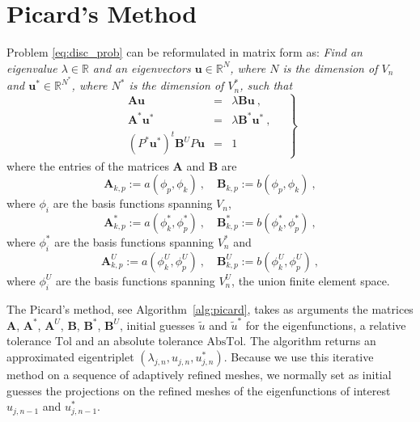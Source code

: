 \documentclass[smallextended]{svjour3}
\begin{document}

\section{Picard's Method}\label{sec:picard}

Problem \eqref{eq:disc_prob} can be reformulated in matrix form as:
\emph{Find an eigenvalue $\lambda\in \mathbb{R}$ and an eigenvectors $\mathbf{u}\in \mathbb{R}^N$, where $N$ is the dimension of $V_n$ and $\mathbf{u}^*\in \mathbb{R}^{N^*}$, where $N^*$ is the dimension of $V_n^*$,
such that}
\begin{equation}
\label{eq:disc_prob_mat}
\left.
\begin{array}{lcl}
\mathbf{A} \mathbf{u}&=& \lambda\mathbf{B}\mathbf{u}\ ,
\\
\mathbf{A}^* \mathbf{u}^*&=& \lambda\mathbf{B}^*\mathbf{u}^*\ ,
\\
(P^*\mathbf{u}^*)^t\mathbf{B}^U P\mathbf{u} &=& 1
\end{array}\quad
\right\}
\end{equation}
where the entries of the matrices $\mathbf{A}$ and $\mathbf{B}$ are 
$$
\mathbf{A}_{k,p}:=a(\phi_p,\phi_k)\ ,\quad\mathbf{B}_{k,p}:=b(\phi_p,\phi_k)\ ,
$$
where $\phi_i$ are the basis functions spanning $V_n$,
$$
\mathbf{A}^*_{k,p}:=a(\phi_k^*,\phi_p^*)\ ,\quad\mathbf{B}^*_{k,p}:=b(\phi_k^*,\phi_p^*)\ ,
$$
where $\phi_i^*$ are the basis functions spanning $V_n^*$ and
$$
\mathbf{A}^U_{k,p}:=a(\phi_k^U,\phi_p^U)\ ,\quad\mathbf{B}^U_{k,p}:=b(\phi_k^U,\phi_p^U)\ ,
$$
where $\phi_i^U$ are the basis functions spanning $V_n^U$, the union finite element space.



The Picard's method, see Algorithm~\ref{alg:picard}, takes as arguments the matrices $\mathbf{A}$, $\mathbf{A}^*$, $\mathbf{A}^U$, $\mathbf{B}$, $\mathbf{B}^*$, $\mathbf{B}^U$, initial guesses $\tilde u$ and $\tilde u^*$ for the eigenfunctions, a relative tolerance $\mathrm{Tol}$ and an absolute tolerance $\mathrm{AbsTol}$. 
The algorithm returns an approximated eigentriplet $(\lambda_{j,n},u_{j,n},u_{j,n}^*)$.
Because we use this iterative method on a sequence of adaptively refined meshes, we normally set as initial guesses
the projections on the refined meshes of the eigenfunctions of interest $u_{j,n-1}$ and $u_{j,n-1}^*$.
\end{document}
